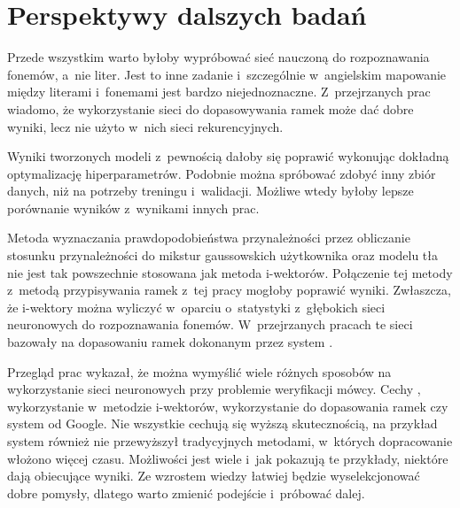 \section{Perspektywy dalszych badań}

Przede wszystkim warto byłoby wypróbować sieć nauczoną do rozpoznawania fonemów, a~nie liter.
Jest to inne zadanie i~szczególnie w~angielskim mapowanie między literami i~fonemami
jest bardzo niejednoznaczne. Z~przejrzanych prac wiadomo, że wykorzystanie sieci
do dopasowywania ramek może dać dobre wyniki, lecz nie użyto w~nich sieci rekurencyjnych.

Wyniki tworzonych modeli z~pewnością dałoby się poprawić wykonując dokładną
optymalizację hiperparametrów. Podobnie można spróbować zdobyć inny zbiór danych,
niż  na potrzeby treningu i~walidacji. Możliwe wtedy
byłoby lepsze porównanie wyników z~wynikami innych prac.

Metoda wyznaczania prawdopodobieństwa przynależności przez obliczanie stosunku
przynależności do mikstur gaussowskich użytkownika oraz modelu tła nie jest
tak powszechnie stosowana jak metoda i-wektorów. Połączenie tej metody
z~metodą przypisywania ramek z~tej pracy mogłoby poprawić wyniki.
Zwłaszcza, że i-wektory można wyliczyć w~oparciu o~statystyki z~głębokich sieci
neuronowych do rozpoznawania fonemów. W~przejrzanych pracach te sieci bazowały
na dopasowaniu ramek dokonanym przez system .

Przegląd prac wykazał, że można wymyślić wiele różnych sposobów na wykorzystanie sieci neuronowych przy problemie
weryfikacji mówcy. Cechy , wykorzystanie  w~metodzie i-wektorów,
wykorzystanie  do dopasowania ramek czy system  od Google.
Nie wszystkie cechują się wyższą skutecznością, na przykład system 
również nie przewyższył tradycyjnych metodami, w~których dopracowanie włożono więcej czasu.
Możliwości jest wiele i~jak pokazują te przykłady, niektóre dają obiecujące wyniki. Ze wzrostem wiedzy łatwiej
będzie wyselekcjonować dobre pomysły, dlatego warto zmienić podejście i~próbować dalej.

